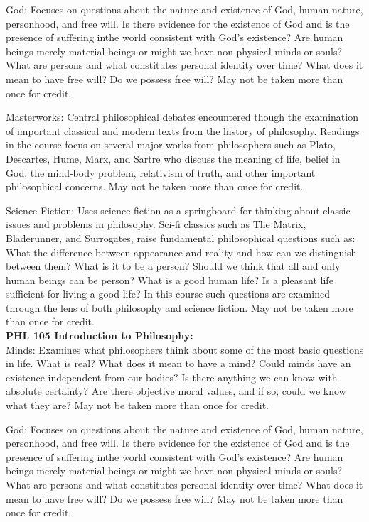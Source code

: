 \documentclass[
  letterpaper,
]{scrbook}
\begin{document}
God: Focuses on questions about the nature and existence of God, human
nature, personhood, and free will. Is there evidence for the existence
of God and is the presence of suffering inthe world consistent with
God's existence? Are human beings merely material beings or might we
have non-physical minds or souls? What are persons and what constitutes
personal identity over time? What does it mean to have free will? Do we
possess free will? May not be taken more than once for credit.

Masterworks: Central philosophical debates encountered though the
examination of important classical and modern texts from the history of
philosophy. Readings in the course focus on several major works from
philosophers such as Plato, Descartes, Hume, Marx, and Sartre who
discuss the meaning of life, belief in God, the mind-body problem,
relativism of truth, and other important philosophical concerns. May not
be taken more than once for credit.

Science Fiction: Uses science fiction as a springboard for thinking
about classic issues and problems in philosophy. Sci-fi classics such as
The Matrix, Bladerunner, and Surrogates, raise fundamental philosophical
questions such as: What the difference between appearance and reality
and how can we distinguish between them? What is it to be a person?
Should we think that all and only human beings can be person? What is a
good human life? Is a pleasant life sufficient for living a good life?
In this course such questions are examined through the lens of both
philosophy and science fiction. May not be taken more than once for
credit.\\
\textbf{PHL 105 Introduction to Philosophy:}\\
Minds: Examines what philosophers think about some of the most basic
questions in life. What is real? What does it mean to have a mind? Could
minds have an existence independent from our bodies? Is there anything
we can know with absolute certainty? Are there objective moral values,
and if so, could we know what they are? May not be taken more than once
for credit.

God: Focuses on questions about the nature and existence of God, human
nature, personhood, and free will. Is there evidence for the existence
of God and is the presence of suffering inthe world consistent with
God's existence? Are human beings merely material beings or might we
have non-physical minds or souls? What are persons and what constitutes
personal identity over time? What does it mean to have free will? Do we
possess free will? May not be taken more than once for credit.
\end{document}
